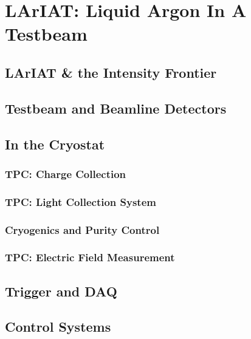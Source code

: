 \chapter{LArIAT: Liquid Argon In A Testbeam}\label{sec:experimentDescription}
\section{LArIAT \& the Intensity Frontier}
\section{Testbeam and Beamline Detectors}
\section{In the Cryostat}

\subsection{TPC: Charge Collection}\label{sec:TPC}
\subsection{TPC: Light Collection System}
\subsection{Cryogenics and Purity Control}
\subsection{TPC: Electric Field Measurement}
\section{Trigger and DAQ}
\section{Control Systems}
